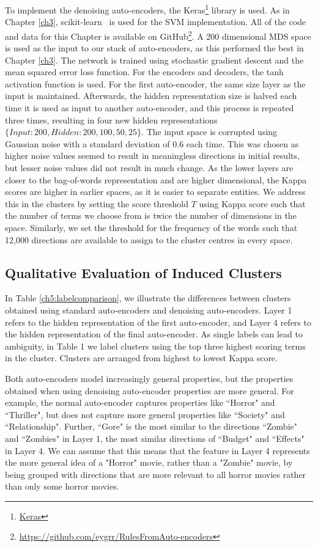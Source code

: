 To implement the denoising auto-encoders, the Keras\footnote{\href{https://keras.io/}{Keras}}  library is used. As in Chapter \ref{ch3}, scikit-learn~\cite{Pedregosa2012} is used for the SVM implementation. All of the code and data for this Chapter is available on GitHub\footnote{\url{https://github.com/eygrr/RulesFromAuto-encoders}}. A 200 dimensional MDS space is used as the input to our stack of auto-encoders, as this performed the best in Chapter \ref{ch3}. The network is trained using stochastic gradient descent and the mean squared error loss function. For the encoders and decoders, the tanh activation function is used. For the first auto-encoder,  the same size layer as the input is maintained. Afterwards, the hidden representation size is halved each time it is used  as input to another auto-encoder, and this process is repeated three times, resulting in four new hidden representations $\{Input: 200, Hidden: 200, 100, 50, 25\}$. The input space is corrupted using  Gaussian noise with a standard deviation of 0.6 each time. This was chosen as higher noise values seemed to result in meaningless directions in initial results, but lesser noise values did not result in much change. As the lower layers are closer to the bag-of-words representation and are higher dimensional, the Kappa scores are higher in earlier spaces, as it is easier to separate entities. We address this in the clusters by setting the  score threshold $T$ using Kappa score  such that the number of terms we choose from is twice the number of dimensions in the space. Similarly, we set the threshold for the frequency of the words such that 12,000 directions are available to assign to the cluster centres in every space. 

\subsection{Qualitative Evaluation of Induced Clusters}

In Table \ref{ch5:labelcomparison}, we illustrate the differences between clusters obtained using standard auto-encoders and denoising auto-encoders. Layer 1 refers to the hidden representation of the first auto-encoder, and Layer 4 refers to the hidden representation of the final auto-encoder. As single labels can lead to ambiguity, in Table 1 we label clusters using the top three highest scoring terms in the cluster. Clusters are arranged from highest to lowest Kappa score. 

Both auto-encoders model increasingly general properties, but the properties obtained when using denoising auto-encoder properties are more general. For example, the normal auto-encoder captures properties like ``Horror" and ``Thriller", but does not capture more general properties like ``Society" and ``Relationship". Further, ``Gore"  is the  most similar to the directions ``Zombie" and ``Zombies" in Layer 1, the most similar directions of ``Budget" and ``Effects" in Layer 4. We can assume that this means that the feature in Layer 4 represents the more general idea of a "Horror" movie, rather than a "Zombie" movie, by being grouped with directions that are more relevant to all horror movies rather than only some horror movies. 

